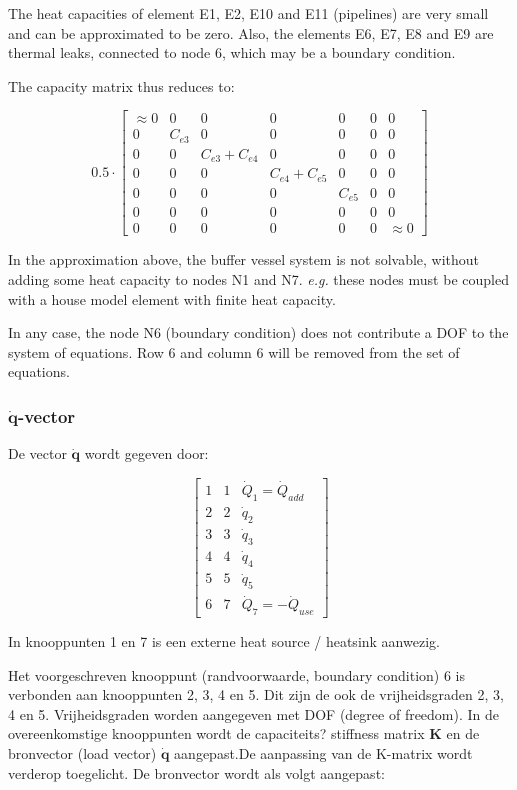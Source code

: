 The heat capacities of element E1, E2, E10 and E11 (pipelines) are very small and can be approximated to be zero. Also, the elements E6, E7, E8 and E9 are thermal leaks, connected to node 6, which may be a boundary condition.

The capacity matrix thus reduces to:

\[
0.5 \cdot 
\begin{bmatrix}
	\approx 0 & 0 & 0 & 0 & 0 & 0 & 0 \\
	0 & C_{e3} & 0 & 0 & 0 & 0 & 0 \\
	0 & 0 & C_{e3} + C_{e4} & 0 & 0 & 0 & 0 \\
	0 & 0 & 0 & C_{e4} + C_{e5} & 0 & 0 & 0 \\
	0 & 0 & 0 & 0 & C_{e5} & 0 & 0 \\
	0 & 0 & 0 & 0 & 0 & 0 & 0 \\
	0 & 0 & 0 & 0 & 0 & 0 & \approx 0
\end{bmatrix}
\]

In the approximation above, the buffer vessel system is not solvable, without adding some heat capacity to nodes N1 and N7. \emph{e.g.} these nodes must be coupled with a house model element with finite heat capacity.

In any case, the node N6 (boundary condition) does not contribute a DOF to the system of equations. Row 6 and column 6 will be removed from the set of equations.

\subsubsection{$\mathbf{\dot{q}}$-vector}

De vector $\mathbf{\dot{q}}$ wordt gegeven door:

\[
\begin{bmatrix}
	1 & 1 & \dot{Q}_1 = \dot{Q}_{add}\\
	2 & 2 & \dot{q}_2\\
	3 & 3 & \dot{q}_3\\
	4 & 4 & \dot{q}_4\\
	5 & 5 & \dot{q}_5\\
	6 & 7 & \dot{Q}_7 = -\dot{Q}_{use}
\end{bmatrix}
\]

In knooppunten 1 en 7 is een externe heat source / heatsink aanwezig.

Het voorgeschreven knooppunt (randvoorwaarde, boundary condition) 6 is verbonden aan knooppunten 2, 3, 4 en 5. Dit zijn de ook de vrijheidsgraden 2, 3, 4 en 5. Vrijheidsgraden worden aangegeven met DOF (degree of freedom). In de overeenkomstige knooppunten wordt de capaciteits? stiffness matrix $\mathbf{K}$ en de bronvector (load vector) $\mathbf{\dot{q}}$ aangepast.De aanpassing van de K-matrix wordt verderop toegelicht. De bronvector wordt als volgt aangepast:

